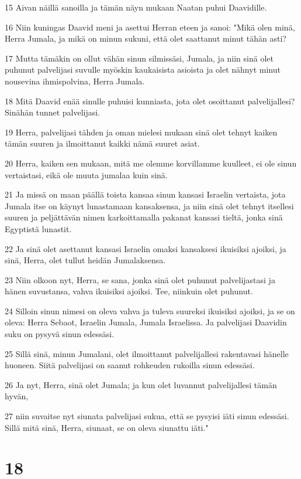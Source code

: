 \par 15 Aivan näillä sanoilla ja tämän näyn mukaan Naatan puhui Daavidille.
\par 16 Niin kuningas Daavid meni ja asettui Herran eteen ja sanoi: "Mikä olen minä, Herra Jumala, ja mikä on minun sukuni, että olet saattanut minut tähän asti?
\par 17 Mutta tämäkin on ollut vähän sinun silmissäsi, Jumala, ja niin sinä olet puhunut palvelijasi suvulle myöskin kaukaisista asioista ja olet nähnyt minut nousevina ihmispolvina, Herra Jumala.
\par 18 Mitä Daavid enää sinulle puhuisi kunniasta, jota olet osoittanut palvelijallesi? Sinähän tunnet palvelijasi.
\par 19 Herra, palvelijasi tähden ja oman mielesi mukaan sinä olet tehnyt kaiken tämän suuren ja ilmoittanut kaikki nämä suuret asiat.
\par 20 Herra, kaiken sen mukaan, mitä me olemme korvillamme kuulleet, ei ole sinun vertaistasi, eikä ole muuta jumalaa kuin sinä.
\par 21 Ja missä on maan päällä toista kansaa sinun kansasi Israelin vertaista, jota Jumala itse on käynyt lunastamaan kansaksensa, ja niin sinä olet tehnyt itsellesi suuren ja peljättävän nimen karkoittamalla pakanat kansasi tieltä, jonka sinä Egyptistä lunastit.
\par 22 Ja sinä olet asettanut kansasi Israelin omaksi kansaksesi ikuisiksi ajoiksi, ja sinä, Herra, olet tullut heidän Jumalaksensa.
\par 23 Niin olkoon nyt, Herra, se sana, jonka sinä olet puhunut palvelijastasi ja hänen suvustansa, vahva ikuisiksi ajoiksi. Tee, niinkuin olet puhunut.
\par 24 Silloin sinun nimesi on oleva vahva ja tuleva suureksi ikuisiksi ajoiksi, ja se on oleva: Herra Sebaot, Israelin Jumala, Jumala Israelissa. Ja palvelijasi Daavidin suku on pysyvä sinun edessäsi.
\par 25 Sillä sinä, minun Jumalani, olet ilmoittanut palvelijallesi rakentavasi hänelle huoneen. Siitä palvelijasi on saanut rohkeuden rukoilla sinun edessäsi.
\par 26 Ja nyt, Herra, sinä olet Jumala; ja kun olet luvannut palvelijallesi tämän hyvän,
\par 27 niin suvaitse nyt siunata palvelijasi sukua, että se pysyisi iäti sinun edessäsi. Sillä mitä sinä, Herra, siunaat, se on oleva siunattu iäti."

\chapter{18}

